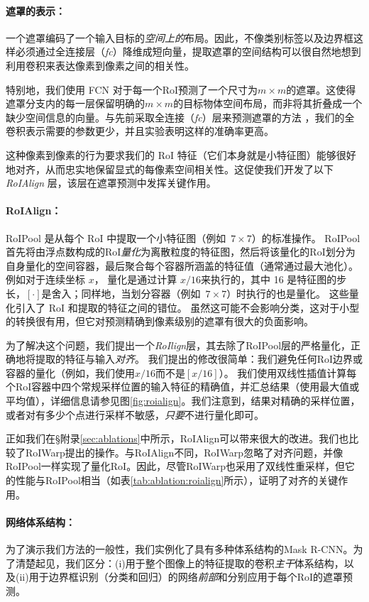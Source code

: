 \paragraph{遮罩的表示：} 一个遮罩编码了一个输入目标的\emph{空间上的}布局。因此，不像类别标签以及边界框这样必须通过全连接层（\emph{fc}）降维成短向量，提取遮罩的空间结构可以很自然地想到利用卷积来表达像素到像素之间的相关性。

特别地，我们使用 FCN  对于每一个RoI预测了一个尺寸为$m \times m$的遮罩。这使得遮罩分支内的每一层保留明确的$m \times m$的目标物体空间布局，而非将其折叠成一个缺少空间信息的向量。与先前采取全连接（\emph{fc}）层来预测遮罩的方法 ，我们的全卷积表示需要的参数更少，并且实验表明这样的准确率更高。

这种像素到像素的行为要求我们的 RoI 特征（它们本身就是小特征图）能够很好地对齐，从而忠实地保留显式的每像素空间相关性。这促使我们开发了以下 \emph{RoIAlign} 层，该层在遮罩预测中发挥关键作用。

\paragraph{RoIAlign：} RoIPool  是从每个 RoI 中提取一个小特征图（例如~$7\times7$）的标准操作。 RoIPool 首先将由浮点数构成的RoI\emph{量化}为离散粒度的特征图，然后将该量化的RoI划分为自身量化的空间容器，最后聚合每个容器所涵盖的特征值（通常通过最大池化）。例如对于连续坐标 $x$， 量化是通过计算 $x / 16$来执行的，其中 16 是特征图的步长，$[\cdot]$是舍入；同样地，当划分容器（例如~$7\times7$）时执行的也是量化。 这些量化引入了 RoI 和提取的特征之间的错位。 虽然这可能不会影响分类，这对于小型的转换很有用，但它对预测精确到像素级别的遮罩有很大的负面影响。

为了解决这个问题，我们提出一个\emph{RoIlign}层，其去除了RoIPool层的严格量化，正确地将提取的特征与输入\emph{对齐}。 我们提出的修改很简单：我们避免任何RoI边界或容器的量化（例如，我们使用$x/16$而不是$[x/16]$）。 我们使用双线性插值计算每个RoI容器中四个常规采样位置的输入特征的精确值，并汇总结果（使用最大值或平均值），详细信息请参见图\ref{fig:roialign}。我们注意到，结果对精确的采样位置，或者对有多少个点进行采样不敏感，\emph{只要}不进行量化即可。

正如我们在\S 附录\ref{sec:ablations}中所示，RoIAlign可以带来很大的改进。我们也比较了RoIWarp提出的操作。与RoIAlign不同，RoIWarp忽略了对齐问题，并像RoIPool一样实现了量化RoI。因此，尽管RoIWarp也采用了双线性重采样，但它的性能与RoIPool相当（如表\ref{tab:ablation:roialign}所示），证明了对齐的关键作用。

\paragraph{网络体系结构：} 为了演示我们方法的一般性，我们实例化了具有多种体系结构的Mask R-CNN。为了清楚起见，我们区分：(i)用于整个图像上的特征提取的卷积\emph{主干}体系结构，以及(ii)用于边界框识别（分类和回归）的网络\emph{前部}和分别应用于每个RoI的遮罩预测。


